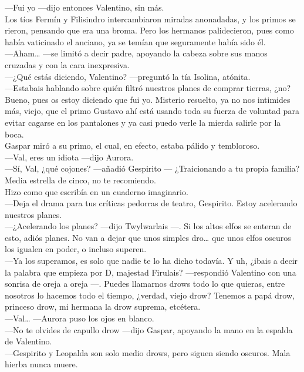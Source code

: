 \documentclass[
  letterpaper,
]{krantz}
\begin{document}
---Fui yo ---dijo entonces Valentino, sin más.\\
Los tíos Fermín y Filisindro intercambiaron miradas anonadadas, y los
primos se rieron, pensando que era una broma. Pero los hermanos
palidecieron, pues como había vaticinado el anciano, ya se temían que
seguramente había sido él.\\
---Aham\ldots{} ---se limitó a decir padre, apoyando la cabeza sobre sus
manos cruzadas y con la cara inexpresiva.\\
---¿Qué estás diciendo, Valentino? ---preguntó la tía Isolina,
atónita.\\
---Estabais hablando sobre quién filtró nuestros planes de comprar
tierras, ¿no? Bueno, pues os estoy diciendo que fui yo. Misterio
resuelto, ya no nos intimides más, viejo, que el primo Gustavo ahí está
usando toda su fuerza de voluntad para evitar cagarse en los pantalones
y ya casi puedo verle la mierda salirle por la boca.\\
Gaspar miró a su primo, el cual, en efecto, estaba pálido y
tembloroso.\\
---Val, eres un idiota ---dijo Aurora.\\
---Sí, Val, ¿qué cojones? ---añadió Gespirito --- ¿Traicionando a tu
propia familia? Media estrella de cinco, no te recomiendo.\\
Hizo como que escribía en un cuaderno imaginario.\\
---Deja el drama para tus críticas pedorras de teatro, Gespirito. Estoy
acelerando nuestros planes.\\
---¿Acelerando los planes? ---dijo Twylwarlais ---. Si los altos elfos
se enteran de esto, adiós planes. No van a dejar que unos simples
dro\ldots{} que unos elfos oscuros los igualen en poder, o incluso
superen.\\
---Ya los superamos, es solo que nadie te lo ha dicho todavía. Y uh,
¿ibais a decir la palabra que empieza por D, majestad Firulais?
---respondió Valentino con una sonrisa de oreja a oreja ---. Puedes
llamarnos drows todo lo que quieras, entre nosotros lo hacemos todo el
tiempo, ¿verdad, viejo drow? Tenemos a papá drow, princeso drow, mi
hermana la drow suprema, etcétera.\\
---Val\ldots{} ---Aurora puso los ojos en blanco.\\
---No te olvides de capullo drow ---dijo Gaspar, apoyando la mano en la
espalda de Valentino.\\
---Gespirito y Leopalda son solo medio drows, pero siguen siendo
oscuros. Mala hierba nunca muere.\\
\end{document}
